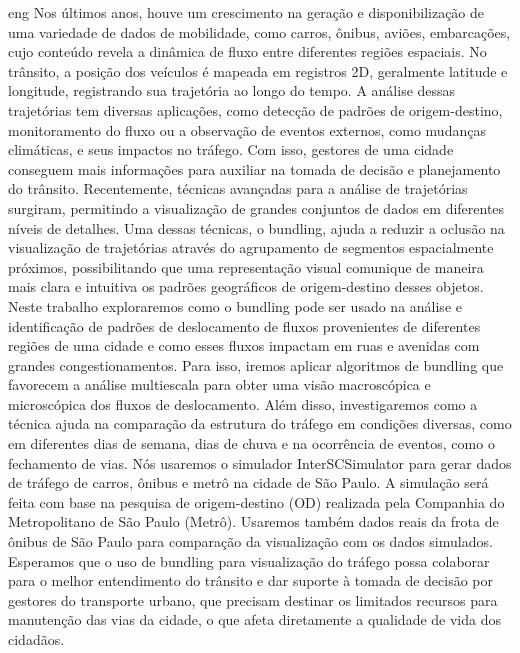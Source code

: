 \begin{resumo}{eng}
  Nos últimos anos, houve um crescimento na geração e disponibilização de uma
variedade de dados de mobilidade, como carros, ônibus, aviões, embarcações,
cujo conteúdo revela a dinâmica de fluxo entre diferentes regiões espaciais. No
trânsito, a posição dos veículos é mapeada em registros 2D, geralmente latitude
e longitude, registrando sua trajetória ao longo do tempo. A análise dessas
trajetórias tem diversas aplicações, como detecção de padrões de
origem-destino, monitoramento do fluxo ou a observação de eventos externos,
como mudanças climáticas, e seus impactos no tráfego. Com isso, gestores de uma
cidade conseguem mais informações para auxiliar na tomada de decisão e
planejamento do trânsito. Recentemente, técnicas avançadas para a análise de
trajetórias surgiram, permitindo a visualização de grandes conjuntos de dados
em diferentes níveis de detalhes. Uma dessas técnicas, o bundling,  ajuda a
reduzir a oclusão na visualização de trajetórias através do agrupamento de
segmentos espacialmente próximos, possibilitando que uma representação visual
comunique de maneira mais clara e intuitiva os padrões geográficos de
origem-destino desses objetos. Neste trabalho exploraremos como o bundling pode
ser usado na análise e identificação de padrões de deslocamento de fluxos
provenientes de diferentes regiões de uma cidade e como esses fluxos impactam
em ruas e avenidas com grandes congestionamentos. Para isso, iremos aplicar
algoritmos de bundling que favorecem a análise multiescala para obter uma
visão macroscópica e microscópica dos fluxos de deslocamento. Além disso,
investigaremos como a técnica ajuda na comparação da estrutura do tráfego em
condições diversas, como em diferentes dias de semana, dias de chuva e na
ocorrência de eventos, como o fechamento de vias. Nós usaremos o simulador
InterSCSimulator para gerar dados de tráfego de carros, ônibus e metrô na
cidade de São Paulo. A simulação será feita com base na pesquisa de
origem-destino (OD) realizada pela Companhia do Metropolitano de São Paulo
(Metrô). Usaremos também dados reais da frota de ônibus de São Paulo para
comparação da visualização com os dados simulados. Esperamos que o uso de
bundling para visualização do tráfego possa colaborar  para o melhor
entendimento do trânsito e dar suporte à tomada de decisão por gestores do
transporte urbano, que precisam destinar os limitados recursos para manutenção
das vias da cidade, o que afeta diretamente a qualidade de vida dos cidadãos.
\end{resumo}
